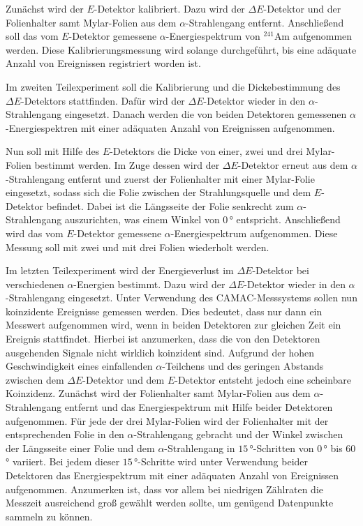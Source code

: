 Zunächst wird der $E$-Detektor kalibriert.
Dazu wird der $\Delta E$-Detektor und der Folienhalter samt Mylar-Folien aus dem $\alpha$-Strahlengang entfernt.
Anschließend soll das vom $E$-Detektor gemessene $\alpha$-Energiespektrum von $^{241}$Am aufgenommen werden.
Diese Kalibrierungsmessung wird solange durchgeführt, bis eine adäquate Anzahl von Ereignissen registriert worden ist.

Im zweiten Teilexperiment soll die Kalibrierung und die Dickebestimmung des $\Delta E$-Detektors stattfinden.
Dafür wird der $\Delta E$-Detektor wieder in den $\alpha$-Strahlengang eingesetzt.
Danach werden die von beiden Detektoren gemessenen $\alpha$-Energiespektren mit einer adäquaten Anzahl von Ereignissen aufgenommen.

Nun soll mit Hilfe des $E$-Detektors die Dicke von einer, zwei und drei Mylar-Folien bestimmt werden.
Im Zuge dessen wird der $\Delta E$-Detektor erneut aus dem $\alpha$-Strahlengang entfernt und zuerst der Folienhalter mit einer Mylar-Folie eingesetzt, sodass sich die Folie zwischen der Strahlungsquelle und dem $E$-Detektor befindet.
Dabei ist die Längsseite der Folie senkrecht zum $\alpha$-Strahlengang auszurichten, was einem Winkel von $0\,$° entspricht.
Anschließend wird das vom $E$-Detektor gemessene $\alpha$-Energiespektrum aufgenommen.
Diese Messung soll mit zwei und mit drei Folien wiederholt werden.

Im letzten Teilexperiment wird der Energieverlust im $\Delta E$-Detektor bei verschiedenen $\alpha$-Energien bestimmt.
Dazu wird der $\Delta E$-Detektor wieder in den $\alpha$-Strahlengang eingesetzt.
Unter Verwendung des CAMAC-Messsystems sollen nun koinzidente Ereignisse gemessen werden.
Dies bedeutet, dass nur dann ein Messwert aufgenommen wird, wenn in beiden Detektoren zur gleichen Zeit ein Ereignis stattfindet.
Hierbei ist anzumerken, dass die von den Detektoren ausgehenden Signale nicht wirklich koinzident sind.
Aufgrund der hohen Geschwindigkeit eines einfallenden $\alpha$-Teilchens und des geringen Abstands zwischen dem $\Delta E$-Detektor und dem $E$-Detektor entsteht jedoch eine scheinbare Koinzidenz.
Zunächst wird der Folienhalter samt Mylar-Folien aus dem $\alpha$-Strahlengang entfernt und das Energiespektrum mit Hilfe beider Detektoren aufgenommen.
Für jede der drei Mylar-Folien wird der Folienhalter mit der entsprechenden Folie in den $\alpha$-Strahlengang gebracht und der Winkel zwischen der Längsseite einer Folie und dem $\alpha$-Strahlengang in $15\,$°-Schritten von $0\,$° bis $60\,$° variiert.
Bei jedem dieser $15\,$°-Schritte wird unter Verwendung beider Detektoren das Energiespektrum mit einer adäquaten Anzahl von Ereignissen aufgenommen.
Anzumerken ist, dass vor allem bei niedrigen Zählraten die Messzeit ausreichend groß gewählt werden sollte, um genügend Datenpunkte sammeln zu können.